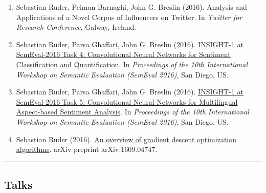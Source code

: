 \documentclass[10pt,letterpaper]{article}
\makeatletter
\newcommand{\headerrow}[2]
{\begin{tabular*}{\linewidth}{l@{\extracolsep{\fill}}r}
	#1 &
	#2 \\
\end{tabular*}}
\makeatother
\begin{document}
\begin{enumerate}
	\item Sebastian Ruder, Peiman Barnaghi, John G. Breslin (2016). Analysis and Applications of a Novel Corpus of Influencers on Twitter. In \textit{Twitter for Research Conference}, Galway, Ireland.
	
	\item Sebastian Ruder, Parsa Ghaffari, John G. Breslin (2016). \href{http://www.anthology.aclweb.org/S/S16/S16-1026.pdf}{INSIGHT-1 at SemEval-2016 Task 4: Convolutional Neural Networks for Sentiment Classification and Quantification}. In \textit{Proceedings of the 10th International Workshop on Semantic Evaluation (SemEval 2016)}, San Diego, US.
	
	\item Sebastian Ruder, Parsa Ghaffari, John G. Breslin (2016). \href{http://www.aclweb.org/anthology/S/S16/S16-1053.pdf}{INSIGHT-1 at SemEval-2016 Task 5: Convolutional Neural Networks for Multilingual Aspect-based Sentiment Analysis}. In \textit{Proceedings of the 10th International Workshop on Semantic Evaluation (SemEval 2016)}, San Diego, US.
	
	\item Sebastian Ruder (2016). \href{https://arxiv.org/pdf/1609.04747.pdf}{An overview of gradient descent optimization algorithms}. arXiv preprint arXiv:1609.04747.

\end{enumerate}

%
%	
%

\hrule
\vspace{-0.4em}
\subsection*{Talks}
\end{document}
